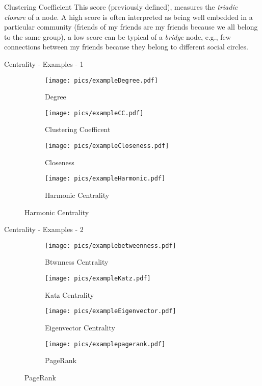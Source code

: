 \begin{textbox}{Clustering Coefficient}
    This score (previously defined), measures the \textit{triadic closure} of a node. A high score is often interpreted as being well embedded in a particular community (friends of my friends are my friends because we all belong to the same group), a low score can be typical of a \textit{bridge} node, e.g., few connections between my friends because they belong to different social circles.
\end{textbox}

\begin{textbox}{Centrality - Examples - 1}
    \begin{figure}[H]
        \begin{subfigure}{.5\textwidth}
            \texttt{[image: pics/exampleDegree.pdf]}
            \caption{Degree}
        \end{subfigure}
        \begin{subfigure}{.5\textwidth}
            \texttt{[image: pics/exampleCC.pdf]}
            \caption{Clustering Coefficent}
        \end{subfigure}

        \begin{subfigure}{.5\textwidth}
            \texttt{[image: pics/exampleCloseness.pdf]}
            \caption{Closeness}
        \end{subfigure}
        \begin{subfigure}{.5\textwidth}
            \texttt{[image: pics/exampleHarmonic.pdf]}
            \caption{Harmonic Centrality}
        \end{subfigure}
    \end{figure}
\end{textbox}

\begin{textbox}{Centrality - Examples - 2}
    \begin{figure}[H]
        \begin{subfigure}{.5\textwidth}
            \texttt{[image: pics/examplebetweenness.pdf]}
            \caption{Btwnness Centrality}
        \end{subfigure}
        \begin{subfigure}{.5\textwidth}
            \texttt{[image: pics/exampleKatz.pdf]}
            \caption{Katz Centrality}
        \end{subfigure}

        \begin{subfigure}{.5\textwidth}
            \texttt{[image: pics/exampleEigenvector.pdf]}
            \caption{Eigenvector Centrality}
        \end{subfigure}
        \begin{subfigure}{.5\textwidth}
            \texttt{[image: pics/examplepagerank.pdf]}
            \caption{PageRank}
        \end{subfigure}
    \end{figure}
\end{textbox}

